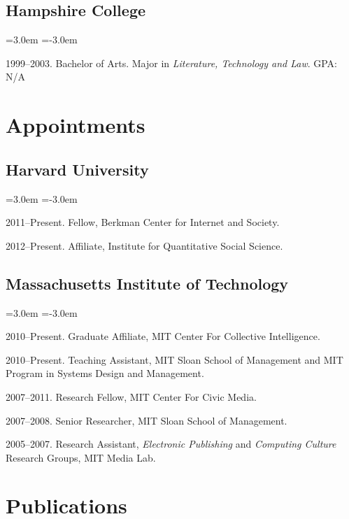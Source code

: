 \documentclass[10pt]{article}
\newenvironment{cvlist}{
\begin{list}{}{\leftmargin=3.0em \itemindent=-3.0em}
  \setlength{\itemsep}{0pt}
  \setlength{\parskip}{0em}
  \setlength{\parsep}{1em}
  \setlength{\parindent}{0em}}
{\vspace{1em}
\end{list}}
\begin{document}
\subsection{Hampshire College}
\begin{cvlist}
\item 1999--2003. Bachelor of Arts. Major in \emph{Literature,
    Technology and Law}. GPA: N/A
\end{cvlist}

\section{Appointments}

\subsection{Harvard University}
\begin{cvlist}
\item 2011--Present. Fellow, Berkman Center for Internet and Society.
\item 2012--Present. Affiliate, Institute for Quantitative Social Science.
\end{cvlist}

\subsection{Massachusetts Institute of Technology}
\begin{cvlist}
\item 2010--Present. Graduate Affiliate, MIT Center For Collective Intelligence.
\item 2010--Present. Teaching Assistant, MIT Sloan School of Management
  and MIT Program in Systems Design and Management.
\item 2007--2011. Research Fellow, MIT Center For Civic Media.
\item 2007--2008. Senior Researcher, MIT Sloan School of Management.
\item 2005--2007. Research Assistant, \emph{Electronic Publishing}
  and \emph{Computing Culture} Research Groups, MIT Media Lab.
\end{cvlist}

\section{Publications}
\end{document}
